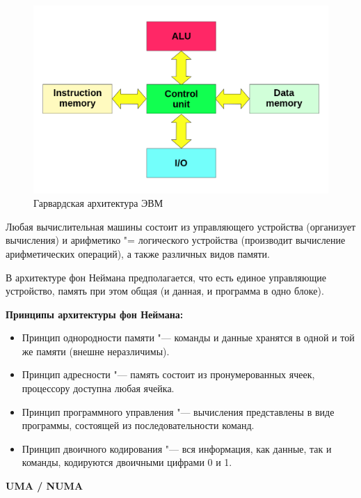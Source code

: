 \documentclass[bachelor, och, book]{SCWorks}
\theoremstyle{remark}
\begin{document}
    \begin{figure}[H]
        \begin{center}
            \includegraphics[scale=0.3]{res/Harvard_architecture.png}
            \caption{Гарвардская архитектура ЭВМ}
        \end{center}
    \end{figure}

    Любая вычислительная машины состоит из управляющего устройства (организует вычисления) и арифметико "= логического устройства (производит вычисление арифметических операций), а также различных видов памяти.
    
    В архитектуре фон Неймана предполагается, что есть единое управляющие устройство, память при этом общая (и данная, и программа в одно блоке).

    \textbf{Принципы архитектуры фон Неймана:} 

    \begin{itemize}[label=$\bullet$]
        \item Принцип однородности памяти "--- команды и данные хранятся в одной и той же памяти (внешне неразличимы).
        \item Принцип адресности "--- память состоит из пронумерованных ячеек, процессору доступна любая ячейка.
        \item Принцип программного управления "--- вычисления представлены в виде программы, состоящей из последовательности команд.
        \item Принцип двоичного кодирования "--- вся информация, как данные, так и команды, кодируются двоичными цифрами 0 и 1.
    \end{itemize}

    \hfill \break
    \begin{center}
        \textbf{UMA / NUMA}        
    \end{center}
\end{document}
